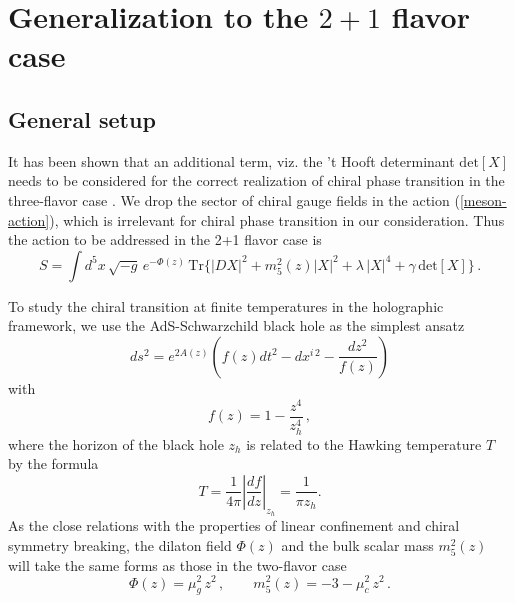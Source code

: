 \documentclass[11pt,a4paper,psfrag]{article}
\begin{document}
\section{Generalization to the $2+1$ flavor case}\label{2plus1generalize1}

\subsection{General setup}\label{setup1}

It has been shown that an additional term, viz. the 't Hooft determinant $\mathrm{det}[X]$ needs to be considered for the correct realization of chiral phase transition in the three-flavor case \cite{Chelabi:2015cwn,Chelabi:2015gpc}. We drop the sector of chiral gauge fields in the action (\ref{meson-action}), which is irrelevant for chiral phase transition in our consideration. Thus the action to be addressed in the 2+1 flavor case is
\begin{equation}\label{2+1f-action}
S=\int d^{5}x\,\sqrt{-g}\,e^{-\Phi(z)}\,{\mathrm{Tr}}\{|D X|^{2}+m_5^2(z)|X|^{2} +\lambda\,|X|^{4} +\gamma\,\mathrm{det}[X]\} \,.
\end{equation}

To study the chiral transition at finite temperatures in the holographic framework, we use the AdS-Schwarzchild black hole as the simplest ansatz
\begin{equation}\label{BH-metric}
ds^2=e^{2A(z)}\left(f(z)dt^2-dx^{i\,2}-\frac{dz^2}{f(z)}\right)
\end{equation}
with
\begin{equation}
f(z)=1-\frac{z^4}{z_h^4} \,,
\end{equation}
where the horizon of the black hole $z_h$ is related to the Hawking temperature $T$ by the formula
\begin{equation}\label{hawking-T}
T=\frac{1}{4\pi}\left|\frac{df}{dz}\right|_{z_{h}}=\frac{1}{\pi z_{h}}.
\end{equation}
As the close relations with the properties of linear confinement and chiral symmetry breaking, the dilaton field $\Phi(z)$ and the bulk scalar mass $m_5^2(z)$ will take the same forms as those in the two-flavor case
\begin{equation}\label{Phi-m5}
\Phi(z)=\mu_g^2\,z^2 \,, \qquad  m_5^2(z)=-3-\mu_c^2\,z^2 \,.
\end{equation}
\end{document}
